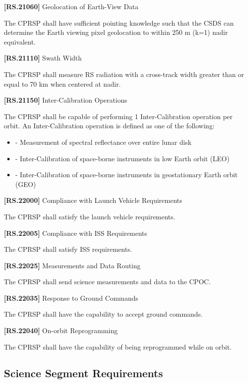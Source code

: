 \textbf{[RS.21060]} Geolocation of Earth-View Data

The \gls{CPRSP} shall have sufficient \gls{point}ing knowledge such that the \gls{CSDS} can determine the Earth viewing pixel geolocation to within 250 m (k=1) nadir equivalent.

\textbf{[RS.21110]} Swath Width

The \gls{CPRSP} shall \gls{measure} \gls{RS} radiation with a cross-track width greater than or equal to 70 km when centered at nadir.

\textbf{[RS.21150]} Inter-Calibration Operations

The \gls{CPRSP} shall be capable of performing 1 Inter-Calibration operation per orbit. An Inter-Calibration operation is defined as one of the following:

\begin{itemize}
\item{} - Measurement of spectral reflectance over entire lunar disk

\item{} - Inter-Calibration of space-borne instruments in low Earth orbit (LEO)

\item{} - Inter-Calibration of space-borne instruments in geostationary Earth orbit (GEO)

\end{itemize}

\textbf{[RS.22000]} Compliance with Launch Vehicle Requirements

The \gls{CPRSP} shall satisfy the launch vehicle requirements.

\textbf{[RS.22005]} Compliance with \gls{ISS} Requirements

The \gls{CPRSP} shall satisfy \gls{ISS} requirements.

\textbf{[RS.22025]} Measurements and Data Routing

The \gls{CPRSP} shall send science \gls{measure}ments and data to the \gls{CPOC}.

\textbf{[RS.22035]} Response to Ground Commands

The \gls{CPRSP} shall have the capability to accept ground commands.

\textbf{[RS.22040]} On-orbit Reprogramming

The \gls{CPRSP} shall have the capability of being reprogrammed while on orbit.

\subsection{Science Segment Requirements}
\label{sciencesegmentrequirements}

